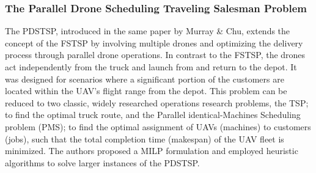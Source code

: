 \documentclass{article}
\begin{document}
	\subsubsection{The Parallel Drone Scheduling Traveling Salesman Problem}
	 The PDSTSP, introduced in the same paper \cite{Murray2015} by Murray \& Chu, extends the concept of the FSTSP by involving multiple drones and optimizing the delivery process through parallel drone operations. In contrast to the FSTSP, the drones act independently from the truck and launch from and return to the depot. It was designed for scenarios where a significant portion of the customers are located within the UAV's flight range from the depot. This problem can be reduced to two classic, widely researched operations research problems, the TSP; to find the optimal truck route, and the Parallel identical-Machines Scheduling problem (PMS); to find the optimal assignment of UAVs (machines) to customers (jobs), such that the total completion time (makespan) of the UAV fleet is minimized. The authors proposed a MILP formulation and employed heuristic algorithms to solve larger instances of the PDSTSP.
\end{document}
